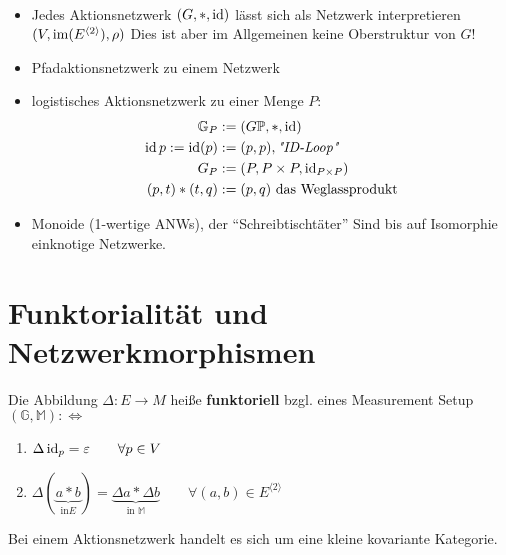 \begin{beispiel}\
	\begin{itemize}
		\item Jedes Aktionsnetzwerk $(G, \ast, \operatorname{id})$ lässt sich als Netzwerk interpretieren \\$(V, \operatorname{im}(E^{\langle 2 \rangle}), \rho)$
		Dies ist aber im Allgemeinen keine Oberstruktur von $G$!
		\item Pfadaktionsnetzwerk zu einem Netzwerk
		\item logistisches Aktionsnetzwerk zu einer Menge $P$:
		\begin{align*}
  			\mathbb{G}_P&:=(G\mathbb{P},\ast,\operatorname{id})\\
    		\operatorname{id} p:=\operatorname{id}(p)&:=(p,p), \textit{"ID-Loop"}\\
    		G_P&:=(P,P\times P,\operatorname{id}_{P\times P})\\
    		(p,t)\ast(t,q)&:=(p,q)\text{ das Weglassprodukt}
		\end{align*}
		\item Monoide (1-wertige ANWs), der ``Schreibtischtäter''
		Sind bis auf Isomorphie einknotige Netzwerke.
	\end{itemize}
\end{beispiel}

\section{Funktorialität und Netzwerkmorphismen}
\begin{definition}
	Die Abbildung $\Delta:E\to M$ heiße \textbf{funktoriell} bzgl. eines Measurement Setup $(\mathbb{G},\mathbb{M}):\Longleftrightarrow$ 
	\begin{enumerate}
		\item $\Delta \operatorname{id}_p=\varepsilon\qquad\forall p\in V$
		\item $\Delta (\underbrace{a\ast b}_{\text{in} E})=\underbrace{\Delta a\ast\Delta b}_{\text{in }\mathbb{M}}\qquad\forall(a,b)\in E^{\langle2\rangle}$
	\end{enumerate}
\end{definition}

\begin{bemerkung}
	Bei einem Aktionsnetzwerk handelt es sich um eine kleine kovariante Kategorie.
\end{bemerkung}

